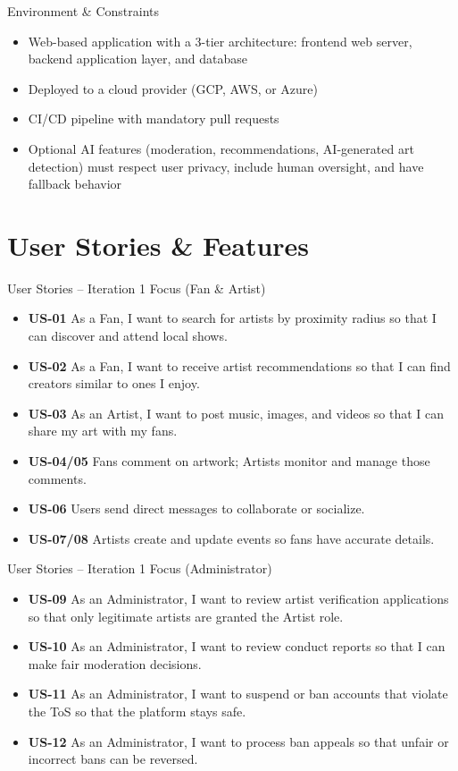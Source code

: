 \documentclass[11pt,aspectratio=169]{beamer}
\newcommand{\iterationNumber}{1} %
\begin{document}
\begin{frame}{Environment \& Constraints}
\begin{itemize}
  \item Web-based application with a 3-tier architecture: frontend web server, backend application layer, and database
  \item Deployed to a cloud provider (GCP, AWS, or Azure)
  \item CI/CD pipeline with mandatory pull requests
  \item Optional AI features (moderation, recommendations, AI-generated art detection) must respect user privacy, include human oversight, and have fallback behavior
\end{itemize}
\end{frame}

\section{User Stories \& Features}

\begin{frame}{User Stories -- Iteration \iterationNumber{} Focus (Fan \& Artist)}
\begin{itemize}
  \item \textbf{US-01} As a Fan, I want to search for artists by proximity radius so that I can discover and attend local shows.
  \item \textbf{US-02} As a Fan, I want to receive artist recommendations so that I can find creators similar to ones I enjoy.
  \item \textbf{US-03} As an Artist, I want to post music, images, and videos so that I can share my art with my fans.
  \item \textbf{US-04/05} Fans comment on artwork; Artists monitor and manage those comments.
  \item \textbf{US-06} Users send direct messages to collaborate or socialize.
  \item \textbf{US-07/08} Artists create and update events so fans have accurate details.
\end{itemize}
\end{frame}

\begin{frame}{User Stories -- Iteration \iterationNumber{} Focus (Administrator)}
\begin{itemize}
  \item \textbf{US-09} As an Administrator, I want to review artist verification applications so that only legitimate artists are granted the Artist role.
  \item \textbf{US-10} As an Administrator, I want to review conduct reports so that I can make fair moderation decisions.
  \item \textbf{US-11} As an Administrator, I want to suspend or ban accounts that violate the ToS so that the platform stays safe.
  \item \textbf{US-12} As an Administrator, I want to process ban appeals so that unfair or incorrect bans can be reversed.
\end{itemize}
\end{frame}
\end{document}
